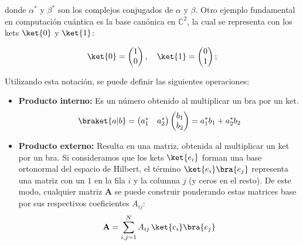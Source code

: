 donde $\alpha^*$ y $\beta^*$ son los complejos conjugados de $\alpha$ y $\beta$. Otro ejemplo fundamental en computación cuántica es la base canónica en $\mathbb{C}^2$, la cual se representa con los kets $\ket{0}$ y $\ket{1}$:

\[
    \ket{0} = \begin{pmatrix} 1 \\ 0 \end{pmatrix}, \quad \ket{1} = \begin{pmatrix} 0 \\ 1 \end{pmatrix};
\]

Utilizando esta notación, se puede definir las siguientes operaciones:

\begin{itemize}
    \item \textbf{Producto interno:} Es un número obtenido al multiplicar un bra por un ket.
          \[ \braket{a|b} = \begin{pmatrix} a_1^{*} & a_2^{*} \end{pmatrix} \begin{pmatrix} b_1\\ b_2 \end{pmatrix} = a_1^{*} b_1 + a_2^{*} b_2 \]
    \item \textbf{Producto externo:} Resulta en una matriz, obtenida al multiplicar un ket por un bra. Si consideramos que los kets $\ket{e_i}$ forman una base ortonormal del espacio de Hilbert, el término $\ket{e_i}\bra{e_j}$ representa una matriz con un $1$ en la fila $i$ y la columna $j$ (y ceros en el resto). De este modo, cualquier matriz $\mathbf{A}$ se puede construir ponderando estas matrices base por sus respectivos coeficientes $A_{ij}$:
          \[ \mathbf{A} = \sum_{i,j=1}^{N} A_{ij}\,\ket{e_i}\bra{e_j} \]
\end{itemize}